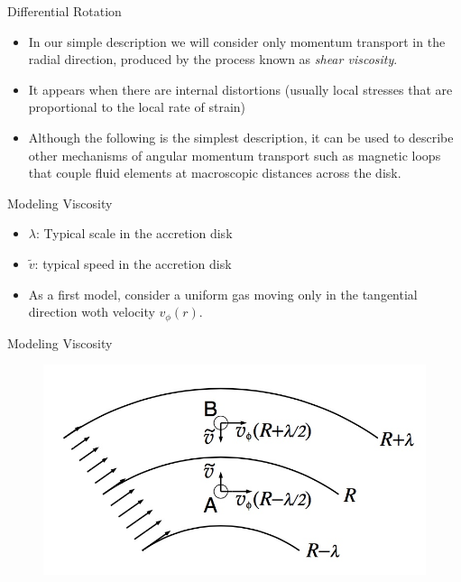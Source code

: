 \documentclass{beamer}
\begin{document}
\begin{frame}{Differential Rotation}
	\begin{itemize}
	\item In our simple description we will consider only momentum transport in the radial direction, produced by the process known as \textit{shear viscosity}.
	\pause
	\item It appears when there are internal distortions (usually local stresses that are proportional to the local rate of strain)
	\pause
	\item Although the following is the simplest description, it can be used to describe other mechanisms of angular momentum transport such as magnetic loops that couple fluid elements at macroscopic distances across the disk.
	\end{itemize}
\end{frame}

\begin{frame}{Modeling Viscosity}
	\begin{itemize}
	\item $\lambda$: Typical scale in the accretion disk
	\pause
	\item $\tilde{v}$: typical speed in the accretion disk
	\pause
	\item As a first model, consider a uniform gas moving only in the tangential direction woth velocity $v_\phi (r)$.
	\end{itemize}
\end{frame}


\begin{frame}{Modeling Viscosity}
	\begin{center}
      \begin{figure}
      	\includegraphics[scale=0.4] {figures/differentialRotation.jpeg}
      \end{figure}
	\end{center}	
\end{frame}
\end{document}
